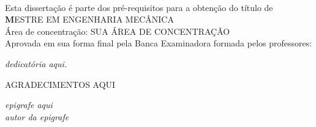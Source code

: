 \documentclass[12pt,openright,oneside,a4paper,brazil]{abntex2} %
\begin{document}
\newpage
\begin{center}
    \LARGE \imprimirtitulo\\
    \vspace{2.5cm}
    \large Esta dissertação é parte dos pré-requisitos para a obtenção do título de\\
    \vspace{0.2cm}
    \Large \textbf MESTRE EM ENGENHARIA MECÂNICA\\
    \vspace{0.5cm}
    \large Área de concentração: SUA ÁREA DE CONCENTRAÇÃO\\
    \vspace{0.8cm}
    \large Aprovada em sua forma final pela Banca Examinadora formada pelos professores:
    \vspace{2cm}
    \vspace{1cm}
    \vspace{1cm}
\end{center}

\newpage
\begin{dedicatoria}
   \vspace*{\fill}
   \noindent
   \hfill \textit{dedicatória aqui.}
\end{dedicatoria}

\begin{agradecimentos}

AGRADECIMENTOS AQUI

\end{agradecimentos}

\begin{epigrafe}
    \vspace*{\fill}
	\begin{flushright}
		\textit{epigrafe aqui\\
		autor da epigrafe}
	\end{flushright}
\end{epigrafe}
\end{document}
